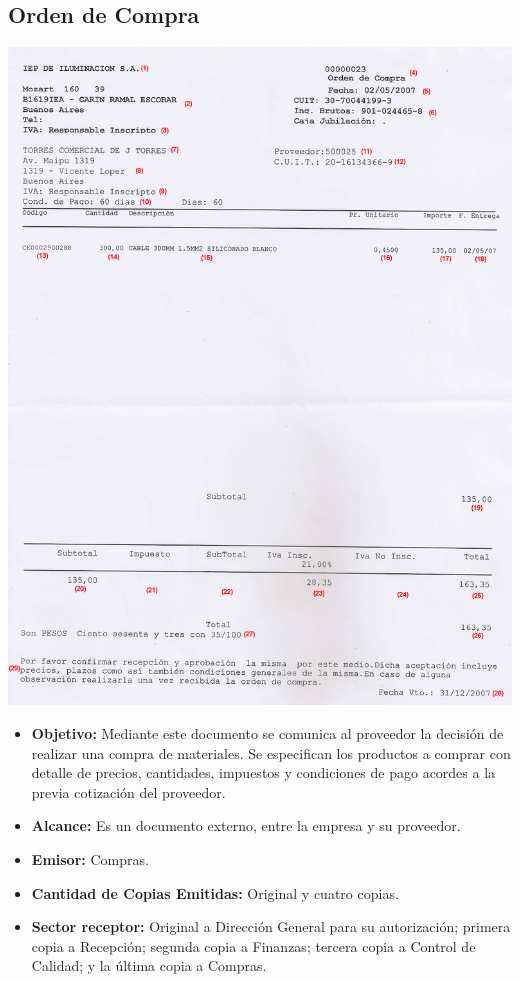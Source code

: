 \subsection{Orden de Compra}
\begin{center}
 \includegraphics[scale=3.2, keepaspectratio=true]{./Images/FormulariosIEP/Orden-de-Compra.png}
\end{center}
\begin{itemize}
  \item \textbf{Objetivo:} Mediante este documento se comunica al proveedor la decisión de realizar una compra de materiales. Se especifican los productos a comprar con detalle de precios, cantidades, impuestos y condiciones de pago acordes a la previa cotización del proveedor.
  \item \textbf{Alcance:} Es un documento externo, entre la empresa y su proveedor.
  \item \textbf{Emisor:} Compras.
  \item \textbf{Cantidad de Copias Emitidas:} Original y cuatro copias.
  \item \textbf{Sector receptor:} Original a Dirección General para su autorización; primera copia a Recepci\'on; segunda copia a Finanzas; tercera copia a Control de Calidad; y la \'ultima copia a Compras.
 \end{itemize}
